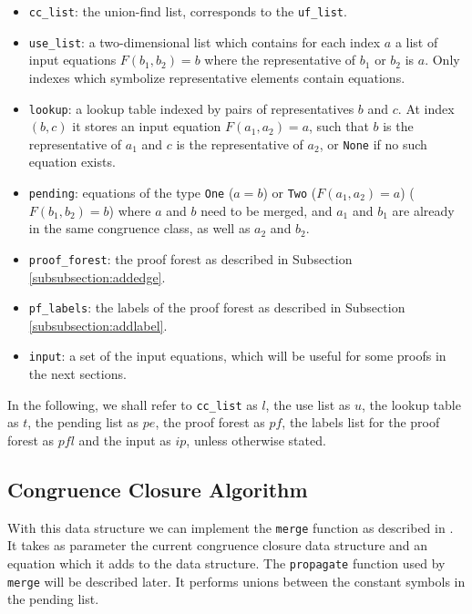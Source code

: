 \begin{itemize}
	\item \lstinline{cc_list}: the union-find list, corresponds to the \lstinline{uf_list}.

	\item \lstinline{use_list}: a two-dimensional list which contains for each index $a$ a list of input equations $F(b_1, b_2) = b$ where the representative of $b_1$ or $b_2$ is $a$.
    Only indexes which symbolize representative elements contain equations.

	\item \lstinline{lookup}: a lookup table indexed by pairs of representatives $b$ and $c$. At index $(b,c)$ it stores an input equation $F(a_1, a_2) = a$, such that $b$ is the representative of $a_1$ and $c$ is the representative of $a_2$, or \lstinline{None} if no such equation exists.

    \item \lstinline{pending}: equations of the type \lstinline{One} ($a = b$) or \lstinline{Two} ($F(a_1, a_2) = a$) ($F(b_1, b_2) = b$) where $a$ and $b$ need to be merged, and $a_1$ and $b_1$ are already in the same congruence class, as well as $a_2$ and $b_2$.

    \item \lstinline{proof_forest}: the proof forest as described in Subsection \ref{subsubsection:addedge}.

    \item \lstinline{pf_labels}: the labels of the proof forest as described in Subsection \ref{subsubsection:addlabel}.

    \item \lstinline{input}: a set of the input equations, which will be useful for some proofs in the next sections.
\end{itemize}

In the following, we shall refer to \lstinline{cc_list} as $l$, the use list as $u$, the lookup table as $t$, the pending list as $pe$, the proof forest as $pf$, the labels list for the proof forest as $pfl$ and the input as $ip$, unless otherwise stated.

\subsection{Congruence Closure Algorithm}

With this data structure we can implement the \lstinline{merge} function as described in \cite{Nieuwenhuis}.
It takes as parameter the current congruence closure data structure and an equation which it adds to the data structure. The \lstinline{propagate} function used by \lstinline{merge} will be described later. It performs unions between the constant symbols in the pending list.

